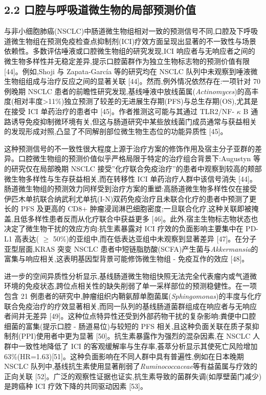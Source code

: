 \subsection{2.2 口腔与呼吸道微生物的局部预测价值}\label{ux53e3ux8154ux4e0eux547cux5438ux9053ux5faeux751fux7269ux7684ux5c40ux90e8ux9884ux6d4bux4ef7ux503c}

与非小细胞肺癌(NSCLC)中肠道微生物组相对一致的预测信号不同,口腔及下呼吸道微生物组在预测免疫检查点抑制剂(ICI)疗效方面呈现出显著的不一致性与场景依赖性。多数评估唾液或口腔微生物组的研究发现,ICI 响应者与无响应者之间的微生物多样性并无稳定差异,提示口腔菌群作为独立生物标志物的预测价值有限 {[}44{]}。例如,Shoji 与 Zapata-García 等的研究均在 NSCLC 队列中未观察到唾液微生物组组成与治疗反应之间的显著关联 {[}44{]}。然而,例外情况依然存在:一项针对 70 例晚期 NSCLC 患者的前瞻性研究发现,基线唾液中放线菌属(\emph{Actinomyces})的高丰度(相对丰度\textgreater11\%)独立预测了较差的无进展生存期(PFS)与总生存期(OS),尤其是在接受 ICI 单药治疗的患者中 {[}45{]}。作者推测这可能与其通过 TLR2/NF- \(\kappa\) B 通路诱导免疫抑制微环境有关,但这与肠道研究中某些放线菌门成员通常与获益相关的发现形成对照,凸显了不同解剖部位微生物生态位的功能异质性 {[}45{]}。

这种预测信号的不一致性很大程度上源于治疗方案的修饰作用及宿主分子亚群的差异。口腔微生物组的预测价值似乎严格局限于特定的治疗组合背景下:Augustyn 等的研究仅在局部晚期 NSCLC 接受''化疗联合免疫治疗''的患者中观察到较高的颊部微生物多样性与生存获益相关,而在转移性 ICI 单药治疗人群中该信号消失 {[}44{]}。肠道微生物组的预测效力同样受到治疗方案的重塑:高肠道微生物多样性仅在接受伊匹木单抗联合纳武利尤单抗(I-N)双药免疫治疗且未联合化疗的患者中预测了更长的 PFS 及更高的 CD8+ 肿瘤浸润淋巴细胞密度;一旦联合化疗,这种关联即被掩盖,且低多样性患者反而从化疗联合中获益更多 {[}46{]}。此外,宿主生物标志物状态也决定了微生物干扰的效应方向:抗生素暴露对 ICI 疗效的负面影响主要集中在 PD-L1 高表达( \(\geq\) 50\%)的亚组中,而在低表达亚组中未观察到显著差异 {[}47{]}。在分子亚型层面,KRAS 突变 NSCLC 患者中短链脂肪酸(SCFA)产生菌与\emph{Akkermansia}的富集与响应相关,这表明基因型背景可能修饰微生物组 - 免疫互作的效应 {[}48{]}。

进一步的空间异质性分析显示,基线肠道微生物组快照无法完全代表瘤内或气道微环境的免疫状态,跨位点相关性的缺失削弱了单一采样部位的预测稳健性。在一项包含 21 例患者的研究中,肿瘤组织内鞘氨醇单胞菌属(\emph{Sphingomonas})的丰度与化疗联合免疫治疗的疗效显著相关,而同一队列的基线肠道菌群组成在响应者与无响应者间并无差异 {[}49{]}。这种位点特异性还受到外部药物干扰的复杂影响:粪便中口腔细菌的富集(提示口腔 - 肠道易位)与较短的 PFS 相关,且这种负面关联在质子泵抑制剂(PPI)使用者中更为显著 {[}50{]}。抗生素暴露作为强烈的混杂因素,在 NSCLC 人群中一致性地降低了 ICI 的客观缓解率与生存率,荟萃分析显示其使死亡风险增加 63\%(HR=1.63){[}51{]}。这种负面影响在不同人群中具有普遍性,例如在日本晚期 NSCLC 队列中,基线抗生素使用显著削弱了\emph{Ruminococcaceae}等有益菌属与疗效的正向关联 {[}52{]}。广泛的观察性证据也证实,抗生素导致的菌群失调(如厚壁菌门减少)是跨癌种 ICI 疗效下降的共同驱动因素 {[}53{]}。

